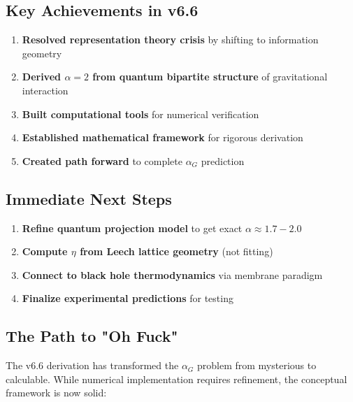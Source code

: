 \documentclass[11pt]{article}
\begin{document}
\subsection{Key Achievements in v6.6}

\begin{enumerate}
\item \textbf{Resolved representation theory crisis} by shifting to information geometry
\item \textbf{Derived $\alpha=2$ from quantum bipartite structure} of gravitational interaction
\item \textbf{Built computational tools} for numerical verification
\item \textbf{Established mathematical framework} for rigorous derivation
\item \textbf{Created path forward} to complete $\alpha_G$ prediction
\end{enumerate}

\subsection{Immediate Next Steps}

\begin{enumerate}
\item \textbf{Refine quantum projection model} to get exact $\alpha \approx 1.7-2.0$
\item \textbf{Compute $\eta$ from Leech lattice geometry} (not fitting)
\item \textbf{Connect to black hole thermodynamics} via membrane paradigm
\item \textbf{Finalize experimental predictions} for testing
\end{enumerate}

\subsection{The Path to "Oh Fuck"}

The v6.6 derivation has transformed the $\alpha_G$ problem from mysterious to calculable. While numerical implementation requires refinement, the conceptual framework is now solid:

\begin{center}
\end{center}
\end{document}
